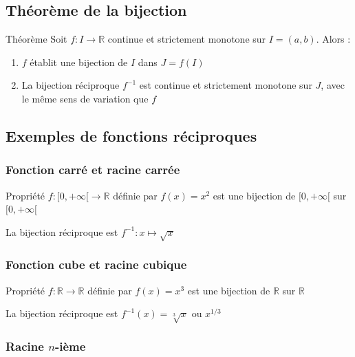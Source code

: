 \documentclass[a4paper,11pt]{article}
\begin{document}
\subsection{Théorème de la bijection}

\begin{theorembox}{Théorème}
Soit $f : I \to \mathbb{R}$ continue et strictement monotone sur $I = (a, b)$. Alors :
\begin{enumerate}
    \item $f$ établit une bijection de $I$ dans $J = f(I)$
    \item La bijection réciproque $f^{-1}$ est continue et strictement monotone sur $J$, avec le même sens de variation que $f$
\end{enumerate}
\end{theorembox}

\subsection{Exemples de fonctions réciproques}

\subsubsection{Fonction carré et racine carrée}

\begin{propbox}{Propriété}
$f : [0, +\infty[ \to \mathbb{R}$ définie par $f(x) = x^2$ est une bijection de $[0, +\infty[$ sur $[0, +\infty[$

La bijection réciproque est $f^{-1} : x \mapsto \sqrt{x}$
\end{propbox}

\subsubsection{Fonction cube et racine cubique}

\begin{propbox}{Propriété}
$f : \mathbb{R} \to \mathbb{R}$ définie par $f(x) = x^3$ est une bijection de $\mathbb{R}$ sur $\mathbb{R}$

La bijection réciproque est $f^{-1}(x) = \sqrt[3]{x}$ ou $x^{1/3}$
\end{propbox}

\subsubsection{Racine $n$-ième}
\end{document}
